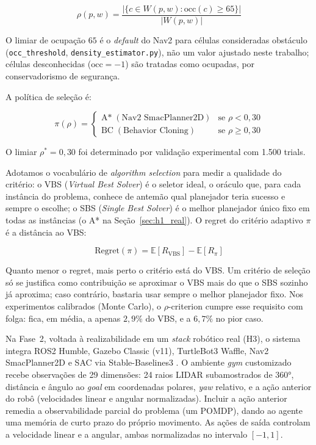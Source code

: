 \documentclass[12pt, a4paper]{article}
\begin{document}
\begin{equation}
  \rho(p, w) = \frac{\lvert\{c \in W(p,w) : \mathrm{occ}(c) \geq 65\}\rvert}{\lvert W(p,w)\rvert}
\end{equation}

O limiar de ocupação $65$ é o \textit{default} do Nav2 para células consideradas obstáculo
(\texttt{occ\_threshold}, \texttt{density\_estimator.py}), não um valor ajustado neste trabalho;
células desconhecidas ($\mathrm{occ}=-1$) são tratadas como ocupadas, por conservadorismo de
segurança.

A política de seleção é:

\begin{equation}
  \pi(\rho) =
  \begin{cases}
    \text{A*} \; (\text{Nav2 SmacPlanner2D}) & \text{se } \rho < 0{,}30 \\
    \text{BC} \; (\text{Behavior Cloning}) & \text{se } \rho \geq 0{,}30
  \end{cases}
\end{equation}

O limiar $\rho^* = 0{,}30$ foi determinado por validação experimental com 1.500 trials.
\label{sec:regret}

Adotamos o vocabulário de \textit{algorithm selection} \cite{Rice1976} para medir a qualidade do
critério: o VBS (\textit{Virtual Best Solver}) é o seletor ideal, o oráculo que, para
cada instância do problema, conhece de antemão qual planejador teria sucesso e sempre o escolhe;
o SBS (\textit{Single Best Solver}) é o melhor planejador único fixo em todas as
instâncias (o A* na Seção~\ref{sec:h1_real}). O regret do critério
adaptivo $\pi$ é a distância ao VBS:

\begin{equation}
  \mathrm{Regret}(\pi) = \mathbb{E}[R_{\mathrm{VBS}}] - \mathbb{E}[R_\pi]
\end{equation}

Quanto menor o regret, mais perto o critério está do VBS. Um critério de seleção só se justifica
como contribuição se aproximar o VBS mais do que o SBS sozinho já aproxima; caso contrário,
bastaria usar sempre o melhor planejador fixo. Nos experimentos calibrados (Monte Carlo), o
$\rho$-criterion cumpre esse requisito com folga: fica, em média, a apenas $2{,}9\%$ do VBS, e a
$6{,}7\%$ no pior caso.

Na Fase~2, voltada à realizabilidade em um \textit{stack} robótico real (H3), o sistema integra
ROS2 Humble, Gazebo Classic (v11), TurtleBot3 Waffle, Nav2 SmacPlanner2D e SAC
\cite{Haarnoja2018} via Stable-Baselines3 \cite{Raffin2021}. O ambiente \textit{gym} customizado
recebe observações de 29 dimensões: 24 raios LIDAR subamostrados de 360°, distância e ângulo ao
\textit{goal} em coordenadas polares, \textit{yaw} relativo, e a ação anterior do robô
(velocidades linear e angular normalizadas). Incluir a ação anterior remedia a observabilidade
parcial do problema (um POMDP), dando ao agente uma memória de curto prazo do próprio
movimento. As ações de saída controlam a velocidade linear e a angular, ambas normalizadas no
intervalo $[-1, 1]$.
\end{document}
